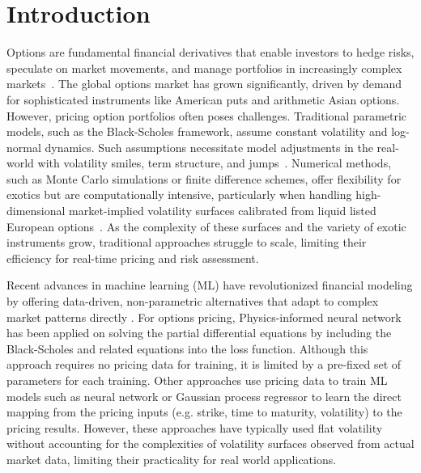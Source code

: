 \documentclass[%
 reprint,
 superscriptaddress,
nobibnotes,
 amsmath,amssymb,
 aip,
]{revtex4-2}
\begin{document}
\section{Introduction}
Options are fundamental financial derivatives that enable investors to hedge risks, speculate on market movements, and manage portfolios in increasingly complex markets~\cite{BlackScholes1973}. The global options market has grown significantly, driven by demand for sophisticated instruments like American puts and arithmetic Asian options\cite{wilmott2013paul,shreve2004stochastic}. However, pricing option portfolios often poses challenges. Traditional parametric models, such as the Black-Scholes framework, assume constant volatility and log-normal dynamics. Such assumptions necessitate model adjustments in the real-world with volatility smiles, term structure, and jumps~\cite{Hull2017,cont2003financial}. Numerical methods, such as Monte Carlo simulations or finite difference schemes, offer flexibility for exotics but are computationally intensive, particularly when handling high-dimensional market-implied volatility surfaces calibrated from liquid listed European options~\cite{Glasserman2004,duffie2010dynamic}. As the complexity of these surfaces and the variety of exotic instruments grow, traditional approaches struggle to scale, limiting their efficiency for real-time pricing and risk assessment.


Recent advances in machine learning (ML)\cite{murphy2012machine,goodfellow2016deep} have revolutionized financial modeling by offering data-driven, non-parametric alternatives that adapt to complex market patterns directly \cite{Dixon2020, Liu2019, Hirsa2019}. For options pricing, Physics-informed neural network\cite{raissi2019physics} has been applied on solving the partial differential equations by including the Black-Scholes and related equations into the loss function\cite{gatta2023meshless, hainaut2024option,wang2023deep,bai2022application}. Although this approach requires no pricing data for training, it is limited by a pre-fixed set of  parameters for each training. Other approaches use pricing data to train ML models such as neural network or Gaussian process regressor to learn the direct mapping from the pricing inputs (e.g. strike, time to maturity, volatility) to the pricing results\cite{de2018machine,ndikum2020machine,gaspar2020neural,anderson2023accelerated}. However, these approaches have typically used flat volatility without accounting for the complexities of volatility surfaces observed from actual market data\cite{cao2021deep,ruf2019neural,bloch2019option,culkin2017machine}, limiting their practicality for real world applications. 
\end{document}
